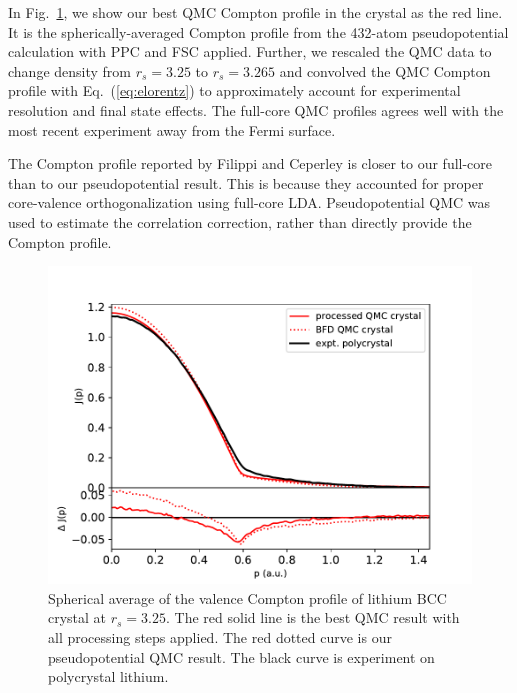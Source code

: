 \documentclass[aps,prb,showpacs,preprintnumbers,amsmath,amssymb,superscriptaddress,twocolumn]{revtex4-1}
\begin{document}
In Fig.~\ref{fig:crystal-vcp}, we show our best QMC Compton profile in the crystal as the red line. It is the spherically-averaged Compton profile from the 432-atom pseudopotential calculation with PPC and FSC applied. Further, we rescaled the QMC data to change density from $r_s=3.25$ to $r_s=3.265$ and convolved the QMC Compton profile with Eq.~(\ref{eq:elorentz}) to approximately account for experimental resolution and final state effects. The full-core QMC profiles agrees well with the most recent experiment away from the Fermi surface.

The Compton profile reported by Filippi and Ceperley \cite{Filippi1999} is closer to our full-core than to our pseudopotential result. This is because they accounted for proper core-valence orthogonalization using full-core LDA. Pseudopotential QMC was used to estimate the correlation correction, rather than directly provide the Compton profile.

\begin{figure}
\includegraphics[width=\linewidth]{li62g_crystal-jp}
\caption{Spherical average of the valence Compton profile of lithium BCC crystal at $r_s=3.25$. The red solid line is the best QMC result with all processing steps applied. The red dotted curve is our pseudopotential QMC result. The black curve is experiment on polycrystal lithium. \label{fig:crystal-vcp}}
\end{figure}
\end{document}

